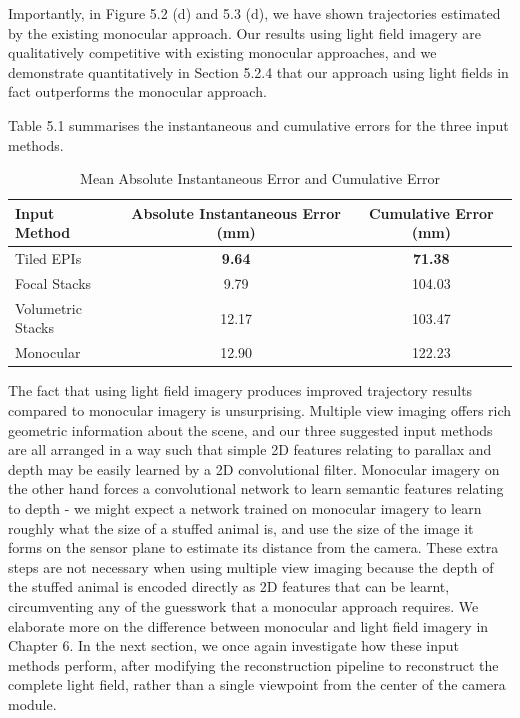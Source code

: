 Importantly, in Figure 5.2 (d) and 5.3 (d), we have shown trajectories estimated by the existing monocular approach. Our results using light field imagery are qualitatively competitive with existing monocular approaches, and we demonstrate quantitatively in Section 5.2.4 that our approach using light fields in fact outperforms the monocular approach. 


Table 5.1 summarises the instantaneous and cumulative errors for the three input methods. 
 
\begin{table}[htbp]
    \caption{Mean Absolute Instantaneous Error and Cumulative Error}
    \centering
    \begin{tabular}{@{}lcc@{}}
        \toprule
        Input Method        & Absolute Instantaneous Error (mm)   & Cumulative Error (mm) \\
        \midrule 
        Tiled EPIs & \textbf{9.64} & \textbf{71.38} \\
        Focal Stacks & 9.79 & 104.03 \\
        Volumetric Stacks & 12.17 & 103.47 \\
        Monocular & 12.90 & 122.23 \\
        \bottomrule
        
    \end{tabular}
\end{table}

The fact that using light field imagery produces improved trajectory results compared to monocular imagery is unsurprising. Multiple view imaging offers rich geometric information about the scene, and our three suggested input methods are all arranged in a way such that simple 2D features relating to parallax and depth may be easily learned by a 2D convolutional filter. Monocular imagery on the other hand forces a convolutional network to learn semantic features relating to depth - we might expect a network trained on monocular imagery to learn roughly what the size of a stuffed animal is, and use the size of the image it forms on the sensor plane to estimate its distance from the camera. These extra steps are not necessary when using multiple view imaging because the depth of the stuffed animal is encoded directly as 2D features that can be learnt, circumventing any of the guesswork that a monocular approach requires. We elaborate more on the difference between monocular and light field imagery in Chapter 6. In the next section, we once again investigate how these input methods perform, after modifying the reconstruction pipeline to reconstruct the complete light field, rather than a single viewpoint from the center of the camera module. 

